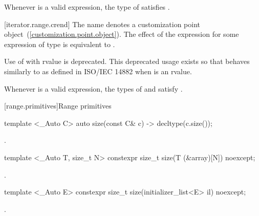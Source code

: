 {\pnum
\enternote Whenever  is a valid expression, the
type of  satisfies . \exitnote

[iterator.range.crend]{}
\pnum
The name  denotes a customization point
object~(\ref{customization.point.object}). The effect of the expression
 for some expression  of type 
is equivalent to .

\pnum
Use of  with rvalue  is deprecated.
\enternote This deprecated usage exists so that 
behaves similarly to  as defined in ISO/IEC 14882 when
 is an rvalue. \exitnote

\pnum
\enternote Whenever  is a valid expression, the
types of  and  satisfy
. \exitnote
} %

{\color{newclr}
[range.primitives]{Range primitives}
}

{\color{oldclr}
%
\begin{itemdecl}
template <_Auto C> auto size(const C& c) -> decltype(c.size());
\end{itemdecl}
\begin{itemdescr}
\pnum \returns {}.
\end{itemdescr}

\begin{itemdecl}
template <_Auto T, size_t N> constexpr size_t size(T (&array)[N]) noexcept;
\end{itemdecl}
\begin{itemdescr}
\pnum \returns {}.
\end{itemdescr}

\begin{itemdecl}
template <_Auto E> constexpr size_t size(initializer_list<E> il) noexcept;
\end{itemdecl}
\begin{itemdescr}
\pnum \returns {}.
\end{itemdescr}
} %

